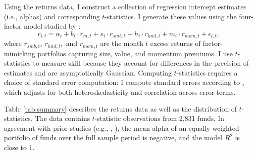 	Using the returns data, I construct a collection of regression intercept estimates (i.e., alphas) and corresponding $t$-statistics. I generate these values using the four-factor model studied by \citet{Carhart1997}:
	\begin{equation}
		\label{eqn:carhart}
		r_{i, t} = \alpha_{i} + b_{i} \cdot r_{m, t} + s_{i} \cdot r_{smb, t} + h_{i} \cdot r_{hml, t} + m_{i} \cdot r_{mom, t} + \epsilon_{i, t},
	\end{equation}
	where $r_{smb, t}, \ r_{hml, t},$ and $r_{mom, t}$ are the month $t$ excess returns of factor-mimicking portfolios capturing size, value, and momentum premiums.  I use $t$-statistics to measure skill because they account for differences in the precision of estimates and are asymptotically Gaussian.  Computing $t$-statistics requires a choice of standard error computation: I compute standard errors according to \citet{Newey1994}, which adjusts for both heteroskedasticity and correlation across error terms.

	Table \ref{tab:summary} describes the returns data as well as the distribution of $t$-statistics.  The data contains $t$-statistic observations from 2,831 funds.  In agreement with prior studies (e.g., \citet{Barras2010}, \citet{Carhart1997}), the mean alpha of an equally weighted portfolio of funds over the full sample period is negative, and the model $R^2$ is close to 1.

